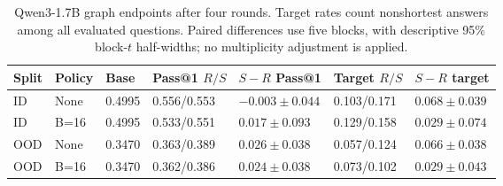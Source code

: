 \begin{table}[H]
\caption{Qwen3-1.7B graph endpoints after four rounds. Target rates count nonshortest answers among all evaluated questions. Paired differences use five blocks, with descriptive 95\% block-$t$ half-widths; no multiplicity adjustment is applied.}
\label{tab:qwen-endpoints}
\centering\small\setlength{\tabcolsep}{3pt}
\begin{tabular}{@{}lllllll@{}}
\toprule
Split & Policy & Base & Pass@1 $R/S$ & $S-R$ Pass@1 & Target $R/S$ & $S-R$ target\\
\midrule
ID & None & 0.4995 & 0.556/0.553 & $-0.003\pm0.044$ & 0.103/0.171 & $0.068\pm0.039$\\
ID & B=16 & 0.4995 & 0.533/0.551 & $0.017\pm0.093$ & 0.129/0.158 & $0.029\pm0.074$\\
OOD & None & 0.3470 & 0.363/0.389 & $0.026\pm0.038$ & 0.057/0.124 & $0.066\pm0.038$\\
OOD & B=16 & 0.3470 & 0.362/0.386 & $0.024\pm0.038$ & 0.073/0.102 & $0.029\pm0.043$\\
\bottomrule
\end{tabular}
\end{table}
